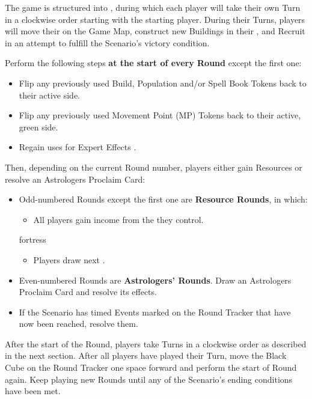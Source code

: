 
\begin{multicols*}{2}

The game is structured into , during which each player will take their own Turn in a clockwise order starting with the starting player.
During their Turns, players will move their  on the Game Map, construct new Buildings in their , and Recruit  in an attempt to fulfill the Scenario's victory condition.\par
Perform the following steps \textbf{at the start of every Round} except the first one:
\begin{itemize}
  \item Flip any previously used Build, Population and/or Spell Book Tokens back to their active side.
  \item Flip any previously used Movement Point (MP) Tokens back to their active, green side.
  \item Regain uses for Expert Effects .
\end{itemize}
Then, depending on the current Round number, players either gain Resources or resolve an Astrologers Proclaim Card:
\begin{itemize}
  \item Odd-numbered Rounds except the first one are \textbf{Resource Rounds}, in which:
    \begin{itemize}
      \item All players gain income from the  they control.
    \end{itemize}
    \begin{expansion}{fortress}
      \begin{itemize}
          \item Players draw next .
      \end{itemize}
    \end{expansion}
  \item Even-numbered Rounds are \textbf{Astrologers' Rounds}.
    Draw an Astrologers Proclaim Card and resolve its effects.
  \item If the Scenario has timed Events marked on the Round Tracker that have now been reached, resolve them.
\end{itemize}
After the start of the Round, players take Turns in a clockwise order as described in the next section.
After all players have played their Turn, move the Black Cube on the Round Tracker one space forward and perform the start of Round again.
Keep playing new Rounds until any of the Scenario's ending conditions have been met.


\end{multicols*}
